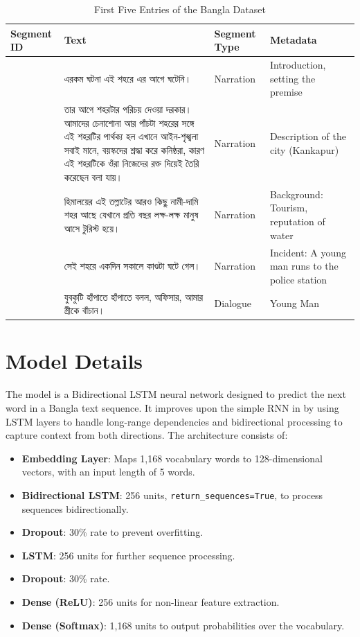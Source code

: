 \documentclass[12pt]{article}
\begin{document}
\begin{table}[H]
\centering
\caption{First Five Entries of the Bangla Dataset}
\label{tab:dataset_sample}
\begin{tabular}{|>{\raggedright\arraybackslash}p{1.5cm}|>{\raggedright\arraybackslash}p{6cm}|>{\raggedright\arraybackslash}p{2cm}|>{\raggedright\arraybackslash}p{3cm}|}
\hline
\textbf{Segment ID} & \textbf{Text} & \textbf{Segment Type} & \textbf{Metadata} \\
\hline
1 & {\bengalifont এরকম ঘটনা এই শহরে এর আগে ঘটেনি।} & Narration & Introduction, setting the premise \\
\hline
2 & {\bengalifont তার আগে শহরটার পরিচয় দেওয়া দরকার। আমাদের চেনাশোনা আর পাঁচটা শহরের সঙ্গে এই শহরটির পার্থক্য হল এখানে আইন-শৃঙ্খলা সবাই মানে, বয়স্কদের শ্রদ্ধা করে কনিষ্ঠরা, কারণ এই শহরটিকে ওঁরা নিজেদের রক্ত দিয়েই তৈরি করেছেন বলা যায়।} & Narration & Description of the city (Kankapur) \\
\hline
3 & {\bengalifont হিমালয়ের এই তল্লাটের আরও কিছু নামী-দামি শহর আছে যেখানে প্রতি বছর লক্ষ-লক্ষ মানুষ আসে টুরিস্ট হয়ে।} & Narration & Background: Tourism, reputation of water \\
\hline
4 & {\bengalifont সেই শহরে একদিন সকালে কাণ্ডটা ঘটে গেল।} & Narration & Incident: A young man runs to the police station \\
\hline
5 & {\bengalifont যুবকুটি হাঁপাতে হাঁপাতে বলল, অফিসার, আমার স্ত্রীকে বাঁচান।} & Dialogue & Young Man \\
\hline
\end{tabular}
\end{table}

\section*{Model Details}
The model is a Bidirectional LSTM neural network designed to predict the next word in a Bangla text sequence. It improves upon the simple RNN in   by using LSTM layers to handle long-range dependencies and bidirectional processing to capture context from both directions. The architecture consists of:

\begin{itemize}
    \item \textbf{Embedding Layer}: Maps 1,168 vocabulary words to 128-dimensional vectors, with an input length of 5 words.
    \item \textbf{Bidirectional LSTM}: 256 units, \texttt{return\_sequences=True}, to process sequences bidirectionally.
    \item \textbf{Dropout}: 30\% rate to prevent overfitting.
    \item \textbf{LSTM}: 256 units for further sequence processing.
    \item \textbf{Dropout}: 30\% rate.
    \item \textbf{Dense (ReLU)}: 256 units for non-linear feature extraction.
    \item \textbf{Dense (Softmax)}: 1,168 units to output probabilities over the vocabulary.
\end{itemize}
\end{document}
